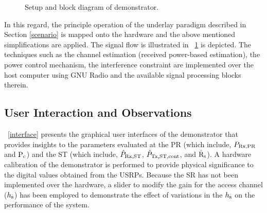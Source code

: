 	\begin{figure}
	\centering
	\def\svgwidth{300pt}
	\caption{Setup and block diagram of demonstrator.}
	\label{demo_blockA}
	\end{figure}
In this regard, the principle operation of the underlay paradigm described in Section \ref{scenario} is mapped onto the hardware and the above mentioned simplifications are applied. The signal flow is illustrated in \figurename~\ref{demo_blockA} is depicted. The techniques such as the channel estimation (received power-based estimation), the power control mechanism, the interference constraint are implemented over the host computer using GNU Radio and the available signal processing blocks therein.


\subsection{User Interaction and Observations}

\figurename~\ref{interface} presents the graphical user interfaces of the demonstrator that provides insights to the parameters evaluated at the PR (which include, $P_{\text{Rx,PR}}$ and $\text{P}_{\text{c}}$) and the ST (which include, $\hat{P}_{\text{Rx,ST}}$, $\hat{P}_{\text{Tx,ST,cont}}$, and $\hat{\text{{R}}}_{\text{s}}$). A hardware calibration of the demonstrator is performed to provide physical significance to the digital values obtained from the USRPs. Because the SR has not been implemented over the hardware, a slider to modify the gain for the access channel ($h_{\text{s}}$) has been employed to demonstrate the effect of variations in the $h_{\text{s}}$ on the performance of the system. %

